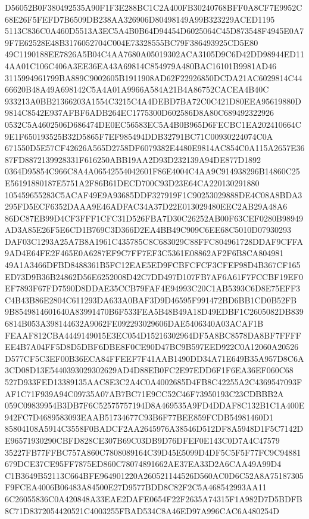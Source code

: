 \documentclass[UTF8,fontset=fandol,zihao=-4,a4paper]{ctexart}
\begin{document}
{{D56052B0F380492535A90F1F3E288BC1C2A400FB30240768BFF0A8CF7E9952C68E26F5FEFD7B6509DB238AA326906D80498149A99B323229ACED1195
5113C836C0A460D5513A3EC5A4B0B64D94454D6025064C45D873548F4945E0A79F7E62528E48B3176052704C004E73328555BC79F386493925CD5E80
49C1190188EE7826A5B04C4AA7680A05019302ACA3105D9C6D42DD98944ED114AA01C106C406A3EE36EA43A69814C854979A480BAC16101B9981AD46
3115994961799BA889C9002605B1911908AD62F22926850DCDA21AC6029814C4466620B48A49A698142C5A4A01A9966A584A21B4A86752CACEA4B40C
933213A0BB21366203A1554C3215C4A4DEBD7BA72C0C421D80EEA95619880D9814C8542E937AFBF6ADB264EC1775300D602586D8A80C689492322926
0532C5A4602506D686474DE0EC56583EC5A4B0B965D6FECBC1EA202410664C9E1F650193525B32D5865F7EF985494DDB32791BC71C00930224074C0A
671550D5E57CF42626A565D2758DF6079382E4480E9814AC854C0A115A2657E3687FD8872139928331F616250ABB19AA2D93D232139A94DE877D1892
0364D95854C966C8A4A06542554042601F86E4004C4AA9C914938296B14860C25E56191880187E5751A2F86B61DECD700C93D23E64CA220130291880
105459655283C5ACAF49E9A93685DDF327919F1C90253029888DE4C08A8BDA3295FD5ECF6352DAAA9E46ADFAC34A37D22E013029480EEC2AB29A48A6
86DC87EB99D4CF3FFF1CFC31D526FBA7D30C26252AB00F63CEF0280B98949AD3A85E26F5E6CD1B769C3D366D2EA4BB49C909C6EE68C5010D07930293
DAF03C1293A25A7B8A1961C435785C8C683029C88FFC804961728DDAF9CFFA9AD4E64FE2F465E0A6287EF9C7FF7EF3C5361E08862AF2F6B8CA804981
49A1A3466DFBD8488361B5FC12EAE5ED9FCBFCFCF3CFEF98D4B367CF165ED73D9B36B24862D56E6252008D42C7DD497D107FB7AF6A61F7FCCBF19EF0
EF7893F67FD7590D8DDAE35CCB79FAF4E94993C20C1AB5393C6D8E75EFF3C4B43B86E2804C611293DA633A0BAF3D9D46595F991472BD6BB1CD0B52FB
9B8549814601640A83991470B6F533FEA5B48B49A18D49EDBF1C2605082DB8396814B053A398144632A9062FE092293029606DAE5406340A03ACAF1B
FEAAF812CBA4449149015E3EC054D15216302964DF5A8BC8578DA8BF7FFFFEE4B7A04FF5D8D5DBF6DBE8F0CE90D47BC9B597EED922C0A12060A20526
D577CF5C3EF00B36ECA84FFEEF7F41AAB1490DD34A71E649B35A957D8C6A3CD08D13E5440393029302629AD4D88EB0FC2E97EDD6F1F6EA36EF060C68
527D933FED13389135AAC8E3C2A4C0A4002685D4FB8C42255A2C4369547093FAF1C71F939A94C09735A07AB7BC71E9CC52C46F73950193C23CDBBB2A
059C09839954B3DB7F6C52575757194D8A469535A9FD4DDAF8C132B1C1A400E942FC7D4689583093EAAB51734677C93B6F77BEE859FCDB54981460D1
85804108A5914C3558F0BADCF2AA2645976A38546D512DF8A5948D1F5C7142DE96571930290CBFD828CE307B69C03DB9D76DFEF0E143C0D7A4C47579
35227FB77FFBC757A860C7808089164C39D45E5099D4DF5C5F5F77FC9C94881679DCE37CE95FF7875ED860C78074891662AE37EA33D2A6CAA49A99D4
C1B3649B52113C664BFE964901220A260521144526D560AC0D6C52A8A75187305F9FCEA4006B06483A84500E27D9577BDD8C82F2C5A468542993AA11
6C26055836C0A420848A33EAE2DAFE0654F22F2635A74315F1A982D7D5BDFB8C71D8372054420521C4003255FBAD534C8A46ED97A996CAC6A480254D
}}
\end{document}
